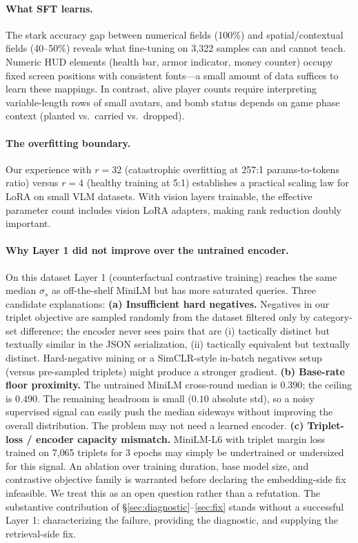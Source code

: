 \documentclass{article}
\begin{document}
\paragraph{What SFT learns.} The stark accuracy gap between numerical fields (100\%) and spatial/contextual fields (40--50\%) reveals what fine-tuning on 3{,}322 samples can and cannot teach. Numeric HUD elements (health bar, armor indicator, money counter) occupy fixed screen positions with consistent fonts---a small amount of data suffices to learn these mappings. In contrast, alive player counts require interpreting variable-length rows of small avatars, and bomb status depends on game phase context (planted vs.\ carried vs.\ dropped).

\paragraph{The overfitting boundary.} Our experience with $r{=}32$ (catastrophic overfitting at 257:1 params-to-tokens ratio) versus $r{=}4$ (healthy training at 5:1) establishes a practical scaling law for LoRA on small VLM datasets. With vision layers trainable, the effective parameter count includes vision LoRA adapters, making rank reduction doubly important.

\paragraph{Why Layer 1 did not improve over the untrained encoder.} On this dataset Layer 1 (counterfactual contrastive training) reaches the same median $\sigma_s$ as off-the-shelf MiniLM but has more saturated queries. Three candidate explanations:
\textbf{(a) Insufficient hard negatives.} Negatives in our triplet objective are sampled randomly from the dataset filtered only by category-set difference; the encoder never sees pairs that are (i) tactically distinct but textually similar in the JSON serialization, (ii) tactically equivalent but textually distinct. Hard-negative mining or a SimCLR-style in-batch negatives setup (versus pre-sampled triplets) might produce a stronger gradient.
\textbf{(b) Base-rate floor proximity.} The untrained MiniLM cross-round median is $0.390$; the ceiling is $0.490$. The remaining headroom is small ($0.10$ absolute std), so a noisy supervised signal can easily push the median sideways without improving the overall distribution. The problem may not need a learned encoder.
\textbf{(c) Triplet-loss / encoder capacity mismatch.} MiniLM-L6 with triplet margin loss trained on 7{,}065 triplets for 3 epochs may simply be undertrained or undersized for this signal. An ablation over training duration, base model size, and contrastive objective family is warranted before declaring the embedding-side fix infeasible.
We treat this as an open question rather than a refutation. The substantive contribution of \S\ref{sec:diagnostic}--\ref{sec:fix} stands without a successful Layer 1: characterizing the failure, providing the diagnostic, and supplying the retrieval-side fix.
\end{document}
